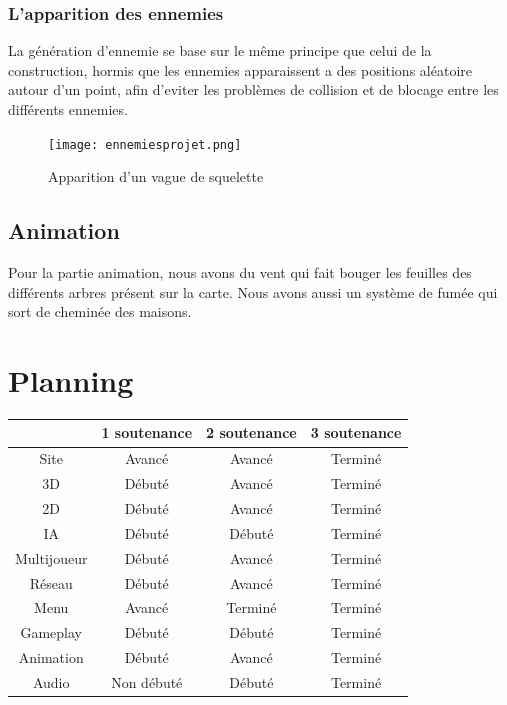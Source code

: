 \documentclass[a4paper, 12pt]{article}
\begin{document}
		\subsubsection{L'apparition des ennemies}
	
		La génération d'ennemie se base sur le même principe que celui de la construction, hormis que les ennemies apparaissent a des positions aléatoire autour d'un point, afin d'eviter les problèmes de collision et de blocage entre les différents ennemies. \\
	\begin{figure}[!ht]
		\centerline{\texttt{[image: ennemiesprojet.png]}}
		\caption*{Apparition d'un vague de squelette}
	\end{figure}

	\subsection{Animation}
	Pour la partie animation, nous avons du vent qui fait bouger les feuilles des différents arbres présent sur la carte.
Nous avons aussi un système de fumée qui sort de cheminée des maisons.

\newpage

\section{Planning}
	\begin{tabular}{|c||c|c|c|}
		\hline
		& 1\iere{} soutenance & 2\ieme{} soutenance & 3\ieme{} soutenance \\
		\hline
		Site &  Avancé & Avancé & Terminé \\
		\hline
		3D & Débuté & Avancé & Terminé \\
		\hline
		2D & Débuté & Avancé & Terminé \\
		\hline
		IA & Débuté & Débuté & Terminé\\
		\hline
		Multijoueur & Débuté & Avancé & Terminé\\
		\hline
		Réseau & Débuté & Avancé & Terminé\\
		\hline
		Menu & Avancé & Terminé & Terminé \\
		\hline
		Gameplay & Débuté & Débuté & Terminé\\
		\hline
		Animation & Débuté & Avancé & Terminé\\		
		\hline
		Audio & Non débuté & Débuté & Terminé\\
		\hline		
	\end{tabular}\\
	\newpage
\end{document}
